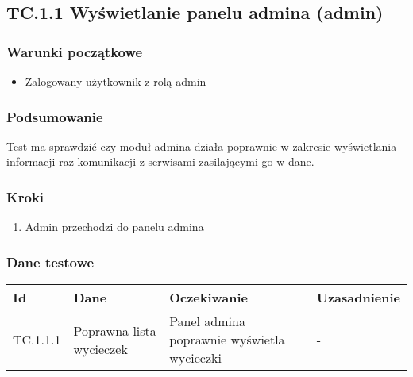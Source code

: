 \documentclass[a4paper,15pt]{article}
\begin{document}
\begin{framed}
\subsection{TC.1.1 Wyświetlanie panelu admina (admin)}

\vspace{0.5cm}

\subsubsection{Warunki początkowe}
\begin{itemize}
\item Zalogowany użytkownik z rolą admin
\end{itemize}

\subsubsection{Podsumowanie}
Test ma sprawdzić czy moduł admina działa poprawnie w zakresie wyświetlania informacji raz komunikacji z serwisami zasilającymi go w dane.

\subsubsection{Kroki}
\begin{enumerate}
\item Admin przechodzi do panelu admina
\end{enumerate}

\subsubsection{Dane testowe}

\begin{center}
\begin{tabular}{ |C{1.5cm}|C{3cm}|C{4cm}|C{4cm}| } 
 \hline
 \textbf{Id} & \textbf{Dane} & \textbf{Oczekiwanie} & \textbf{Uzasadnienie} \\ \hline
 TC.1.1.1 & Poprawna lista wycieczek & Panel admina poprawnie wyświetla wycieczki & - \\ \hline
\end{tabular}
\end{center}
\end{framed}
\end{document}
